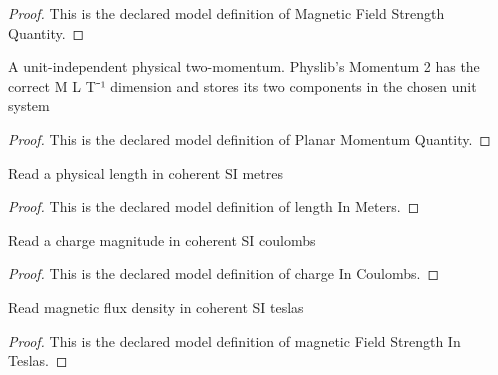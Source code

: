 \begin{proof}
  This is the declared model definition of Magnetic Field Strength Quantity.
\end{proof}
\begin{definition}
  \label{def:physics:phyx-mini-0540:phyxminiproblems-problemphyxmini0540-planarmomentumquantity}
  A unit-independent physical two-momentum. Physlib's Momentum 2 has the correct M L T⁻¹ dimension and stores its two components in the chosen unit system
\end{definition}
\begin{proof}
  This is the declared model definition of Planar Momentum Quantity.
\end{proof}
\begin{definition}
  \label{def:physics:phyx-mini-0540:phyxminiproblems-problemphyxmini0540-lengthinmeters}
  Read a physical length in coherent SI metres
\end{definition}
\begin{proof}
  This is the declared model definition of length In Meters.
\end{proof}
\begin{definition}
  \label{def:physics:phyx-mini-0540:phyxminiproblems-problemphyxmini0540-chargeincoulombs}
  Read a charge magnitude in coherent SI coulombs
\end{definition}
\begin{proof}
  This is the declared model definition of charge In Coulombs.
\end{proof}
\begin{definition}
  \label{def:physics:phyx-mini-0540:phyxminiproblems-problemphyxmini0540-magneticfieldstrengthinteslas}
  Read magnetic flux density in coherent SI teslas
\end{definition}
\begin{proof}
  This is the declared model definition of magnetic Field Strength In Teslas.
\end{proof}
